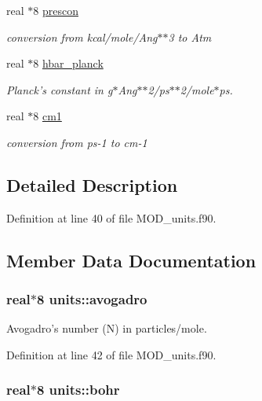 \begin{DoxyCompactItemize}
real $\ast$8 \hyperlink{classunits_a233a5b243e897ecb5ef38f2a0df18efa}{prescon}
\begin{DoxyCompactList}\small\item\em conversion from kcal/mole/\-Ang$\ast$$\ast$3 to Atm \end{DoxyCompactList}\item 
real $\ast$8 \hyperlink{classunits_aaaf8ff6865d0ce8a6ddafc6293b63662}{hbar\-\_\-planck}
\begin{DoxyCompactList}\small\item\em Planck's constant in g$\ast$\-Ang$\ast$$\ast$2/ps$\ast$$\ast$2/mole$\ast$ps. \end{DoxyCompactList}\item 
real $\ast$8 \hyperlink{classunits_a58a7d872bc2e8e7e49778fb46387004a}{cm1}
\begin{DoxyCompactList}\small\item\em conversion from ps-\/1 to cm-\/1 \end{DoxyCompactList}\end{DoxyCompactItemize}


\subsection{Detailed Description}


Definition at line 40 of file M\-O\-D\-\_\-units.\-f90.



\subsection{Member Data Documentation}
\hypertarget{classunits_a24d813d40280b903eea6533f0b044ba9}{
\subsubsection[{avogadro}]{\setlength{\rightskip}{0pt plus 5cm}real$\ast$8 units\-::avogadro}}\label{classunits_a24d813d40280b903eea6533f0b044ba9}


Avogadro's number (N) in particles/mole. 



Definition at line 42 of file M\-O\-D\-\_\-units.\-f90.

\hypertarget{classunits_ae7c14cde165f2f0c1b888e68c66f97a3}{
\subsubsection[{bohr}]{\setlength{\rightskip}{0pt plus 5cm}real$\ast$8 units\-::bohr}}\label{classunits_ae7c14cde165f2f0c1b888e68c66f97a3}


